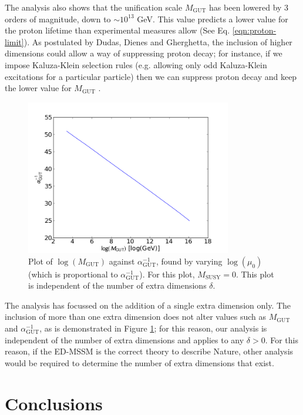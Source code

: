 \documentclass[12pt,a4paper,oneside]{article}
\begin{document}
The analysis also shows that the unification scale $M_\mathrm{GUT}$ has been lowered by 3 orders of magnitude, down to $\sim 10^{13}$ GeV. This value predicts a lower value for the proton lifetime than experimental measures allow (See Eq. \ref{eqn:proton-limit}). As postulated by Dudas, Dienes and Gherghetta, the inclusion of higher dimensions could allow a way of suppressing proton decay; for instance, if we impose Kaluza-Klein selection rules (e.g. allowing only odd Kaluza-Klein excitations for a particular particle) then we can suppress proton decay and keep the lower value for $M_\mathrm{GUT}$ \cite{gherghetta}.

\begin{figure}[th]
\begin{center}
\includegraphics[width=9cm]{figs/gut-variance.png}

\caption[]{Plot of $\log(M_\mathrm{GUT})$ against $\alpha_\mathrm{GUT}^{-1}$, found by varying $\log(\mu_0)$ (which is proportional to $\alpha_\mathrm{GUT}^{-1}$). For this plot, $M_\mathrm{SUSY} = 0$. This plot is independent of the number of extra dimensions $\delta$.}
\label{fig:ed-gut-variance}
\end{center}
\end{figure}

The analysis has focussed on the addition of a single extra dimension only. The inclusion of more than one extra dimension does not alter values such as $M_\mathrm{GUT}$ and $\alpha_\mathrm{GUT}^{-1}$, as is demonstrated in Figure \ref{fig:ed-gut-variance}; for this reason, our analysis is independent of the number of extra dimensions and applies to any $\delta > 0$. For this reason, if the ED-MSSM is the correct theory to describe Nature, other analysis would be required to determine the number of extra dimensions that exist.

\section{Conclusions}
\label{sec:conc}
\end{document}
